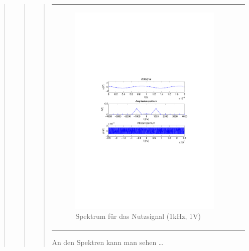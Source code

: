 \begin{quote}
\begin{quote}
\begin{quote}
\begin{center}
\begin{tabular}{ll}
\begin{minipage}{0.6\textwidth}
                     \begin{figure}[H]
                        \includegraphics[scale=0.5, trim = 4cm 9.5cm 3.5cm
                        9.5cm, clip]{./Bilder/spektrum_sin1kHz}
                        \caption{Spektrum für das Nutzsignal (1kHz, 1V)}
                    \end{figure}
               \vspace{-1.5em}

                \end{minipage}

            \end{tabular}
            \end{center}
        
        An den Spektren kann man sehen \ldots \\
        

\end{quote}
\end{quote}
\end{quote}

